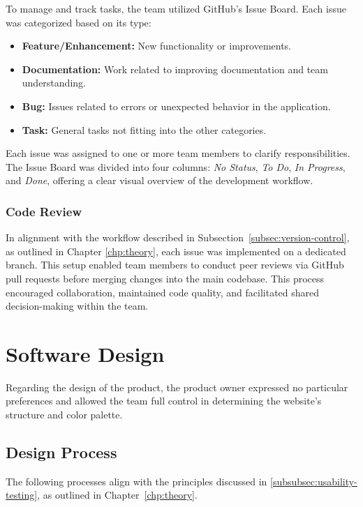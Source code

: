 To manage and track tasks, the team utilized GitHub’s Issue Board. Each issue was categorized based on its type:
\begin{itemize}
  \item \textbf{Feature/Enhancement:} New functionality or improvements.
  \item \textbf{Documentation:} Work related to improving documentation and team understanding.
  \item \textbf{Bug:} Issues related to errors or unexpected behavior in the application.
  \item \textbf{Task:} General tasks not fitting into the other categories.
\end{itemize}

Each issue was assigned to one or more team members to clarify responsibilities. The Issue Board was divided into four columns:
\textit{No Status}, \textit{To Do}, \textit{In Progress}, and \textit{Done}, offering a clear visual overview of the development workflow.

\subsubsection*{Code Review}

In alignment with the workflow described in Subsection~\ref{subsec:version-control}, as outlined in Chapter \ref{chp:theory}, each issue was implemented on a dedicated branch. This setup enabled team members to conduct peer reviews via GitHub pull requests before merging changes into the main codebase. This process encouraged collaboration, maintained code quality, and facilitated shared decision-making within the team.

\newpage




\section{Software Design}
\label{sec:software-design}

Regarding the design of the product, the product owner expressed no particular preferences and allowed the team full control in determining the website’s structure and color palette.

\subsection{Design Process}
\label{subsec:design-process}

The following processes align with the principles discussed in \ref{subsubsec:usability-testing}, as outlined in Chapter~\ref{chp:theory}.

